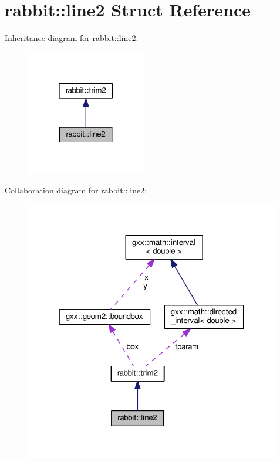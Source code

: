\hypertarget{structrabbit_1_1line2}{}\section{rabbit\+:\+:line2 Struct Reference}
\label{structrabbit_1_1line2}


Inheritance diagram for rabbit\+:\+:line2\+:
\nopagebreak
\begin{figure}[H]
\begin{center}
\leavevmode
\includegraphics[width=148pt]{structrabbit_1_1line2__inherit__graph}
\end{center}
\end{figure}


Collaboration diagram for rabbit\+:\+:line2\+:
\nopagebreak
\begin{figure}[H]
\begin{center}
\leavevmode
\includegraphics[width=316pt]{structrabbit_1_1line2__coll__graph}
\end{center}
\end{figure}
